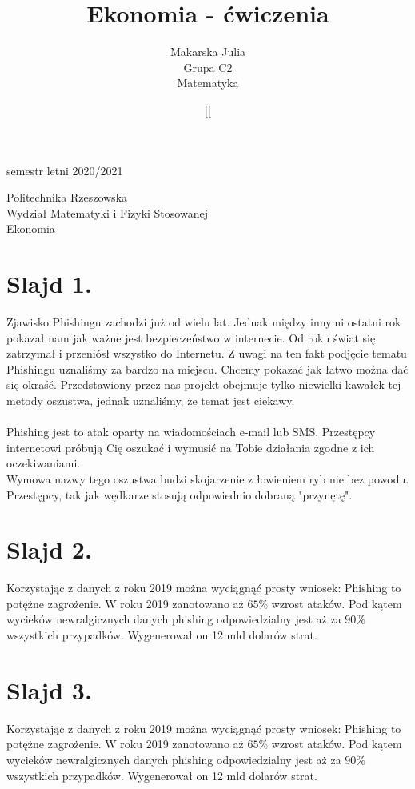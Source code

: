 \documentclass{article}
\date[semestr letni 2020/2021
\author{Makarska Julia\\Grupa C2\\Matematyka}
\title{Ekonomia - ćwiczenia}
\makeatletter
\renewcommand{\maketitle}{\begin{titlepage}
		\vspace{0.5cm}
		\vspace{\stretch{6}}
		\begin{flushright}
			\date[semestr letni 2020/2021
		\end{flushright}	
		\vspace*{2cm}
		\begin{center}
			Politechnika Rzeszowska\\
			Wydział Matematyki i Fizyki Stosowanej\\
			Ekonomia
		\end{center}
		\vspace{3cm}
		\noindent
		\begin{center}
			\Large \@title
		\end{center}
		\vspace{13cm}
		\begin{flushright}
			\begin{minipage}{6.5cm}
				\begin{flushright}
					\normalsize \@author \par
				\end{flushright}
			\end{minipage}
		\end{flushright}
	\end{titlepage}
}
\makeatother
\begin{document}
	\maketitle	
	\tableofcontents %
	\newpage
	
\section{Slajd 1.}
{
	Zjawisko Phishingu zachodzi już od wielu lat. Jednak między innymi ostatni rok pokazał nam jak ważne jest bezpieczeństwo w internecie. Od roku świat się zatrzymał i przeniósł wszystko do Internetu. Z uwagi na ten fakt podjęcie tematu Phishingu uznaliśmy za bardzo na miejscu. Chcemy pokazać jak łatwo można dać się okraść. Przedstawiony przez nas projekt obejmuje tylko niewielki kawałek tej metody oszustwa, jednak uznaliśmy, że temat jest ciekawy.\\
	~\\
	Phishing jest to atak oparty na wiadomościach e-mail lub SMS. Przestępcy internetowi próbują Cię oszukać i wymusić na Tobie działania zgodne z ich oczekiwaniami.\\
	Wymowa nazwy tego oszustwa budzi skojarzenie z łowieniem ryb nie bez powodu. Przestępcy, tak jak wędkarze stosują odpowiednio dobraną "przynętę".
}
\section{Slajd 2.}
{
	Korzystając z danych z roku 2019 można wyciągnąć prosty wniosek: Phishing to potężne zagrożenie. W roku 2019 zanotowano aż $65\%$ wzrost ataków. Pod kątem wycieków newralgicznych danych phishing odpowiedzialny jest aż za $90\%$ wszystkich przypadków. Wygenerował on 12 mld dolarów strat.
}
\section{Slajd 3.}
{
	Korzystając z danych z roku 2019 można wyciągnąć prosty wniosek: Phishing to potężne zagrożenie. W roku 2019 zanotowano aż $65\%$ wzrost ataków. Pod kątem wycieków newralgicznych danych phishing odpowiedzialny jest aż za $90\%$ wszystkich przypadków. Wygenerował on 12 mld dolarów strat.
}
\end{document}
